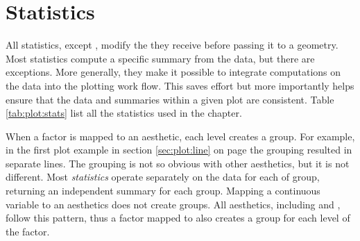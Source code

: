 \documentclass[krantz2]{krantz}\usepackage{knitr}
\begin{document}

\section{Statistics}\label{sec:plot:statistics}
All statistics, except , modify the  they receive before passing it to a geometry. Most statistics compute a specific summary from the data, but there are exceptions. More generally, they make it possible to integrate computations on the data into the plotting work flow. This saves effort but more importantly helps ensure that the data and summaries within a given plot are consistent. Table \ref{tab:plot:stats} list all the statistics used in the chapter.

When a factor is mapped to an aesthetic, each level creates a group. For example, in the first plot example in section \ref{sec:plot:line} on page \pageref{sec:plot:line} the grouping resulted in separate lines. The grouping is not so obvious with other aesthetics, but it is not different. Most \emph{statistics} operate separately on the data for each of group, returning an independent summary for each group. Mapping a continuous variable to an aesthetics does not create groups. All aesthetics, including  and , follow this pattern, thus a factor mapped to  also creates a group for each level of the factor.
\end{document}
